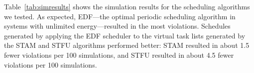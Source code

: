 Table~\ref{tab:simresults} shows the simulation results for the scheduling algorithms we tested.  As expected, EDF---the optimal periodic scheduling algorithm in systems with unlimited energy---resulted in the most violations.  Schedules generated by applying the EDF scheduler to the virtual task lists generated by the STAM and STFU algorithms performed better: STAM resulted in about 1.5 fewer violations per 100 simulations, and STFU resulted in about 4.5 fewer violations per 100 simulations.






























